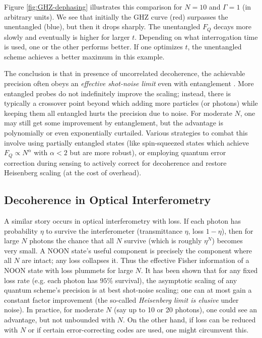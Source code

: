 Figure \ref{fig:GHZ-dephasing} illustrates this comparison for $N=10$
and $\Gamma=1$ (in arbitrary units). We see that initially the GHZ
curve (red) surpasses the unentangled (blue), but then it drops
sharply. The unentangled $F_Q$ decays more slowly and eventually is
higher for larger $t$. Depending on what interrogation time is used,
one or the other performs better. If one optimizes $t$, the
unentangled scheme achieves a better maximum in this example.



The conclusion is that in presence of uncorrelated decoherence, the
achievable precision often obeys an \textit{effective shot-noise
  limit} even with entanglement \cite{Demkowicz2012}. More entangled
probes do not indefinitely improve the scaling; instead, there is
typically a crossover point beyond which adding more particles (or
photons) while keeping them all entangled hurts the precision due to
noise. For moderate $N$, one may still get some improvement by
entanglement, but the advantage is polynomially or even exponentially
curtailed. Various strategies to combat this involve using partially
entangled states (like spin-squeezed states which achieve $F_Q \propto
N^{\alpha}$ with $\alpha<2$ but are more robust), or employing quantum
error correction during sensing \cite{Dur2014} to actively correct for
decoherence and restore Heisenberg scaling (at the cost of overhead).



\subsection{Decoherence in Optical Interferometry}



A similar story occurs in optical interferometry with loss. If each
photon has probability $\eta$ to survive the interferometer
(transmittance $\eta$, loss $1-\eta$), then for large $N$ photons the
chance that all $N$ survive (which is roughly $\eta^N$) becomes very
small. A NOON state’s useful component is precisely the component
where all $N$ are intact; any loss collapses it. Thus the effective
Fisher information of a NOON state with loss plummets for large
$N$. It has been shown \cite{Demkowicz2012} that for any fixed loss
rate (e.g. each photon has $95\%$ survival), the asymptotic scaling of
any quantum scheme’s precision is at best shot-noise scaling; one can
at most gain a constant factor improvement (the so-called
\emph{Heisenberg limit is elusive} under noise). In practice, for
moderate $N$ (say up to 10 or 20 photons), one could see an advantage,
but not unbounded with $N$. On the other hand, if loss can be reduced
with $N$ or if certain error-correcting codes are used, one might
circumvent this.



